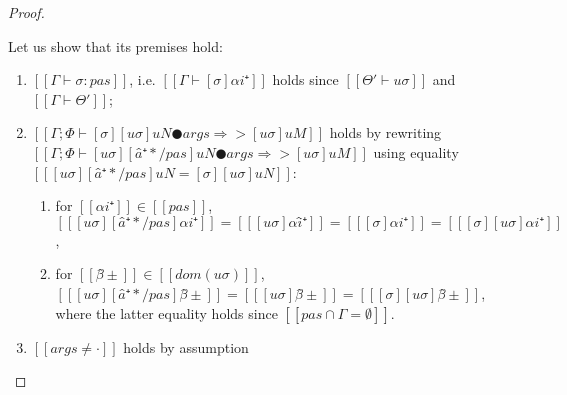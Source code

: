 \begin{proof}
\begin{caseof}
\begin{enumerate}
            Let us show that its premises hold:
            \begin{enumerate}
                \item $[[Γ ⊢ σ : pas]]$, i.e.
                $[[ Γ ⊢ [σ] αi⁺ ]]$ holds since $[[ Θ' ⊢ uσ ]]$ and $[[Γ ⊢ Θ']]$;
                \item $[[Γ; Φ ⊢ [σ][uσ]uN ● args ⇒> [uσ]uM ]]$ 
                    holds by rewriting 
                    $[[ Γ ; Φ ⊢ [uσ][â⁺*/pas]uN ● args ⇒> [uσ]uM ]]$
                    using equality $[[ [uσ][â⁺*/pas]uN = [σ][uσ]uN ]]$:
                    \begin{enumerate}
                        \item for $[[ αi⁺ ]] \in [[ pas ]]$, $[[ [uσ][â⁺*/pas] αi⁺ ]] = [[ [uσ]αî⁺ ]] = [[ [σ]αi⁺ ]] = [[ [σ][uσ]αi⁺ ]]$,
                        \item for $[[ β̂± ]] \in [[ dom(uσ) ]]$, $[[ [uσ][â⁺*/pas]β̂±  ]] = [[ [uσ]β̂±  ]] = [[ [σ][uσ]β̂± ]] $, 
                            where the latter equality holds since $[[ {pas} ∩ {Γ} = ∅ ]]$.
                    \end{enumerate}

                \item $[[args ≠ ·]]$ holds by assumption
            \end{enumerate}
        \end{enumerate}
    \end{caseof}
\end{proof}


